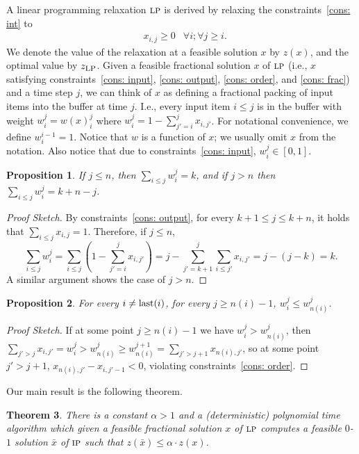 \documentclass[11pt]{article}
\newtheorem{theorem}{Theorem}[section]
\newtheorem{proposition}[theorem]{Proposition}
\newenvironment{proofsketch}{\begin{proof}[Proof Sketch]}{\end{proof}}
\newcommand{\LP}{{\hbox{\sc lp}}}
\newcommand{\IP}{{\hbox{\sc ip}}}
\newcommand{\last}{{\hbox{last}}}
\begin{document}
A linear programming relaxation $\LP$ is derived by relaxing the
constraints~\eqref{cons: int} to
\begin{eqnarray}
\label{cons: frac}
                & x_{i,j}\ge 0                                                     & \forall i;  \forall j\geq i.
\end{eqnarray}
We denote the value of the relaxation at a feasible solution $x$ by $z(x)$,
and the optimal value by $z_{\LP}$.
Given a feasible fractional solution $x$ of $\LP$ (i.e., $x$ satisfying
constraints~\eqref{cons: input}, \eqref{cons: output}, \eqref{cons: order},
and \eqref{cons: frac}) and a time step $j$, we can think of $x$ as defining
a fractional packing of input items into the buffer at time $j$. I.e., every
input item $i\le j$ is in the buffer with weight $w_i^j = w(x)_i^j$
where $w_i^j = 1 - \sum_{j'=i}^j x_{i,j'}$. For notational convenience, we
define $w_i^{i-1} = 1$. Notice that $w$ is a function of $x$; we usually
omit $x$ from the notation. Also notice that due to
constraints~\eqref{cons: input}, $w_i^j\in [0,1]$.
\begin{proposition}\label{pr: capacity constraint}
If $j\le n$, then $\sum_{i\le j} w_i^j = k$,
and if $j > n$ then $\sum_{i\le j} w_i^j = k + n - j$.
\end{proposition}

\begin{proofsketch}
By constraints~\eqref{cons: output}, for every $k+1\le j\le k+n$,
it holds that $\sum_{i\le j} x_{i,j} = 1$. Therefore, if $j\le n$,
$$
\sum_{i\le j} w_i^j  =  \sum_{i\le j} \left(1 - \sum_{j'=i}^j x_{i,j'}\right)
  =   j - \sum_{j'=k+1}^j \sum_{i\le j'} x_{i,j'}
  =  j - (j - k) = k.
$$
A similar argument shows the case of $j > n$.
\end{proofsketch}

\begin{proposition}\label{pr: monotonicity of w}
For every $i\ne\last(i)$, for every $j\ge n(i) - 1$, $w^j_i\le w^j_{n(i)}$.
\end{proposition}

\begin{proofsketch}
If at some point $j\ge n(i) - 1$ we have $w^j_i > w^j_{n(i)}$, then
$\sum_{j' > j} x_{i,j'} = w^j_i > w^j_{n(i)} \ge w^{j+1}_{n(i)} =
\sum_{j' > j+1} x_{n(i),j'}$, so at some point $j' > j+1$,
$x_{n(i),j'}-x_{i,j'-1} < 0$, violating constraints~\eqref{cons: order}.
\end{proofsketch}

Our main result is the following theorem.
\begin{theorem}\label{thm: main}
There is a constant $\alpha > 1$ and a (deterministic) polynomial time
algorithm which given a feasible fractional solution $x$ of $\LP$ computes
a feasible $0$-$1$ solution $\bar{x}$ of $\IP$ such that
$z(\bar{x})\le\alpha\cdot z(x)$.
\end{theorem}
\end{document}
